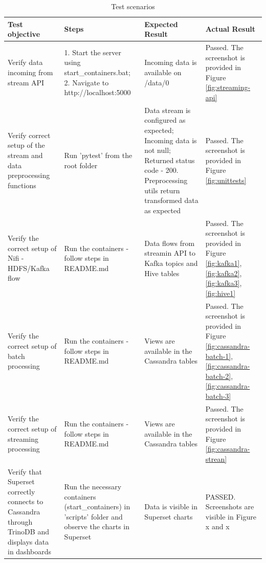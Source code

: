 \documentclass[12pt,a4paper, hidelinks]{article}
\begin{document}
\begin{table}[h!]
\centering
\begin{tabular}{|p{3cm}|p{4cm}|p{3cm}|p{5cm}|}
\hline
\textbf{Test objective} & \textbf{Steps} & \textbf{Expected Result} & \textbf{Actual Result} \\
\hline
Verify data incoming from stream API & 1. Start the server using start\_containers.bat; 2. Navigate to http://localhost:5000 & Incoming data is available on /data/0 & Passed. The screenshot is provided in Figure \ref{fig:streaming-api} \\
\hline
Verify correct setup of the stream and data preprocessing functions & Run 'pytest' from the root folder & Data stream is configured as expected; Incoming data is not null; Returned status code - 200. Preprocessing utils return transformed data as expected & Passed. The screenshot is provided in Figure \ref{fig:unittests} \\
\hline
Verify the correct setup of Nifi - HDFS/Kafka flow & Run the containers - follow steps in README.md & Data flows from streamin API to Kafka topics and Hive tables & Passed. The screenshot is provided in Figure \ref{fig:kafka1}, \ref{fig:kafka2}, \ref{fig:kafka3}, \ref{fig:hive1} \\
\hline
Verify the correct setup of batch processing & Run the containers - follow steps in README.md & Views are available in the Cassandra tables & Passed. The screenshot is provided in Figure \ref{fig:cassandra-batch-1}, \ref{fig:cassandra-batch-2}, \ref{fig:cassandra-batch-3} \\
\hline
Verify the correct setup of streaming processing & Run the containers - follow steps in README.md & Views are available in the Cassandra tables & Passed. The screenshot is provided in Figure \ref{fig:cassandra-strean} \\
\hline
Verify that Superset correctly connects to Cassandra through TrinoDB and displays data in dashboards & Run the necessary containers (start\_containers) in 'scripts' folder and observe the charts in Superset &
Data is visible in Superset charts &
PASSED. Screenshots are visible in Figure x and x\\
\hline

\end{tabular}
\caption{Test scenarios}
\end{table}
\end{document}
